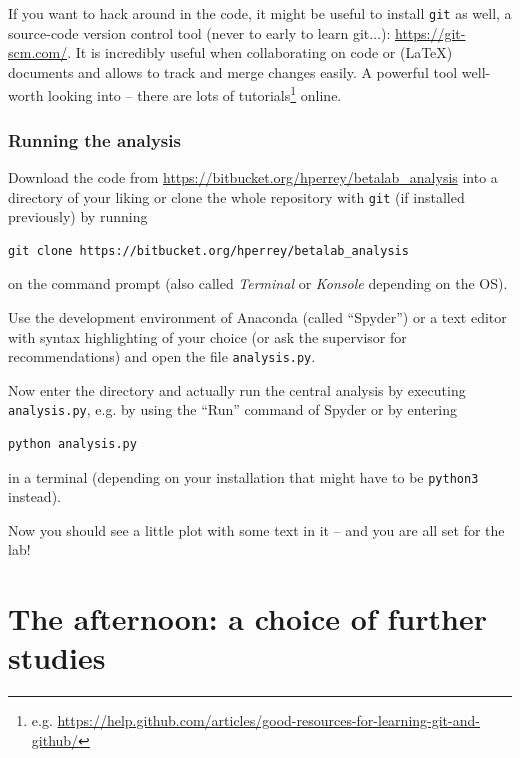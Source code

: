 \documentclass[a4,11pt, notitlepage]{article}
\begin{document}
If you want to hack around in the code, it might be useful to install
\texttt{git} as well, a source-code version control tool (never to
early to learn git$\ldots$): \url{https://git-scm.com/}. It is
incredibly useful when collaborating on code or (\LaTeX) documents and
allows to track and merge changes easily. A powerful tool well-worth
looking into -- there are lots of tutorials\footnote{e.g. \url{https://help.github.com/articles/good-resources-for-learning-git-and-github/}} online.

\subsubsection{Running the analysis}
\label{sec:running-analysis}

Download the code from
\url{https://bitbucket.org/hperrey/betalab_analysis} into a directory
of your liking or clone the whole repository with \texttt{git} (if
installed previously) by running
\begin{verbatim}
git clone https://bitbucket.org/hperrey/betalab_analysis
\end{verbatim}
on the command prompt (also called \emph{Terminal} or \emph{Konsole}
depending on the OS).

Use the development environment of Anaconda (called ``Spyder'') or a
text editor with syntax highlighting of your choice (or ask the supervisor for
recommendations) and open the file \texttt{analysis.py}.

Now enter the directory and actually run the central analysis by
executing \texttt{analysis.py}, e.g. by using the ``Run'' command of
Spyder or by entering
\begin{verbatim}
python analysis.py
\end{verbatim}
in a terminal (depending on your installation that might have to be
\texttt{python3} instead).

Now you should see a little plot with some text in it -- and you are all
set for the lab!


\section{The afternoon: a choice of further studies}
\label{sec:afternoon}
\end{document}
